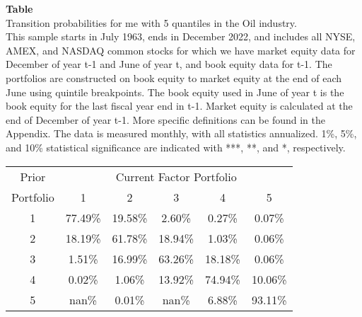 \begin{table*}[ht!]
\raggedright
{}
\label{tab: transition_probs_me_Oil_with_5_quantiles}
\textbf{Table \thetable} \\
Transition probabilities for me with 5 quantiles in the Oil industry. \\
\hspace*{1em}This sample starts in July 1963, ends in December 2022, and includes all NYSE, AMEX, and NASDAQ common stocks for which we have market equity data for December of year t-1 and June of year t, and book equity data for t-1. The portfolios are constructed on book equity to market equity at the end of each June using quintile breakpoints.  The book equity used in June of year t is the book equity for the last fiscal year end in t-1.  Market equity is calculated at the end of December of year t-1.  More specific definitions can be found in the Appendix.  The data is measured monthly, with all statistics annualized.  1\%, 5\%, and 10\% statistical significance are indicated with ***, **, and *, respectively. \\
\vspace{0.5em}
\centering
\begin{adjustbox}{max width=\textwidth}
\begin{tabular}{@{}cccccc@{}}
\toprule
Prior & \multicolumn{5}{c}{Current Factor Portfolio} \\
Portfolio & 1 & 2 & 3 & 4 & 5 \\
\midrule
1 & 77.49\% & 19.58\% & 2.60\% & 0.27\% & 0.07\% \\
2 & 18.19\% & 61.78\% & 18.94\% & 1.03\% & 0.06\% \\
3 & 1.51\% & 16.99\% & 63.26\% & 18.18\% & 0.06\% \\
4 & 0.02\% & 1.06\% & 13.92\% & 74.94\% & 10.06\% \\
5 & nan\% & 0.01\% & nan\% & 6.88\% & 93.11\% \\
\bottomrule
\end{tabular}
\end{adjustbox}
\end{table*}